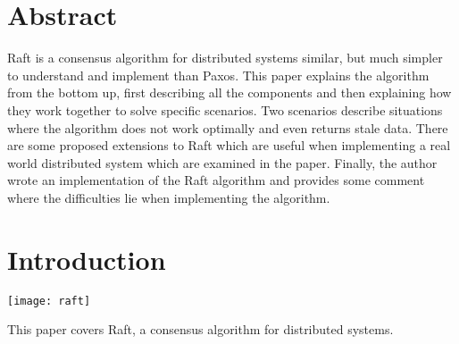




\begin{titlepage}
\afterpage{\restorepagecolor}
\newcommand{\colorRule}[3][black]{\textcolor[HTML]{#1}{\rule{#2}{#3}}}
\end{titlepage}
\restoregeometry



{
\hypersetup{linkcolor=}
\setcounter{tocdepth}{3}
\tableofcontents
\pagebreak
}

\section{Abstract}

Raft is a consensus algorithm for distributed systems similar, but much simpler to understand and implement than Paxos.
This paper explains the algorithm from the bottom up, first describing all the components and
then explaining how they work together to solve specific scenarios.
Two scenarios describe situations where the algorithm does not work optimally and even returns stale data.
There are some proposed extensions to Raft which are useful when implementing a real world distributed system
which are examined in the paper. Finally, the author wrote an implementation of the Raft algorithm
and provides some comment where the difficulties lie when implementing the algorithm.

\section{Introduction}

\texttt{[image: raft]}

This paper covers Raft, a consensus algorithm for distributed systems.

